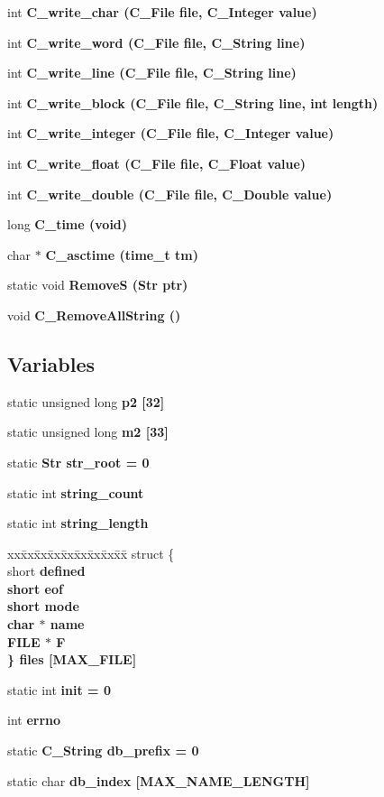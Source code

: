 \begin{CompactItemize}
\item 
int \bf{C\_\-write\_\-char} (\bf{C\_\-File} \bf{file}, \bf{C\_\-Integer} value)
\item 
int \bf{C\_\-write\_\-word} (\bf{C\_\-File} \bf{file}, \bf{C\_\-String} line)
\item 
int \bf{C\_\-write\_\-line} (\bf{C\_\-File} \bf{file}, \bf{C\_\-String} line)
\item 
int \bf{C\_\-write\_\-block} (\bf{C\_\-File} \bf{file}, \bf{C\_\-String} line, int length)
\item 
int \bf{C\_\-write\_\-integer} (\bf{C\_\-File} \bf{file}, \bf{C\_\-Integer} value)
\item 
int \bf{C\_\-write\_\-float} (\bf{C\_\-File} \bf{file}, \bf{C\_\-Float} value)
\item 
int \bf{C\_\-write\_\-double} (\bf{C\_\-File} \bf{file}, \bf{C\_\-Double} value)
\item 
long \bf{C\_\-time} (void)
\item 
char $\ast$ \bf{C\_\-asctime} (time\_\-t tm)
\item 
static void \bf{Remove\-S} (\bf{Str} ptr)
\item 
void \bf{C\_\-Remove\-All\-String} ()
\end{CompactItemize}
\subsection*{Variables}
\begin{CompactItemize}
\item 
static unsigned long \bf{p2} [32]
\item 
static unsigned long \bf{m2} [33]
\item 
static \bf{Str} \bf{str\_\-root} = 0
\item 
static int \bf{string\_\-count}
\item 
static int \bf{string\_\-length}
\item 
\begin{tabbing}
xx\=xx\=xx\=xx\=xx\=xx\=xx\=xx\=xx\=\kill
struct \{\\
\>short \bf{defined}\\
\>short \bf{eof}\\
\>short \bf{mode}\\
\>char $\ast$ \bf{name}\\
\>FILE $\ast$ \bf{F}\\
\} \bf{files} [MAX\_FILE]\\

\end{tabbing}\item 
static int \bf{init} = 0
\item 
int \bf{errno}
\item 
static \bf{C\_\-String} \bf{db\_\-prefix} = 0
\item 
static char \bf{db\_\-index} [MAX\_\-NAME\_\-LENGTH]
\end{CompactItemize}


